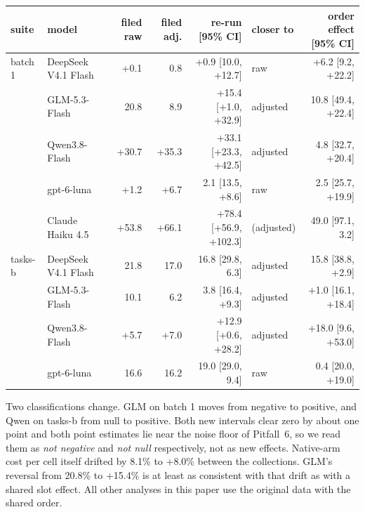 \documentclass[10pt]{article}
\newcommand*{\mi}{\textminus}   %
\newenvironment{inlinetable}{\par\medskip\noindent\begin{minipage}{\linewidth}\centering\small}{\end{minipage}\par\bigskip}
\begin{document}
\begin{inlinetable}
\label{tab:rerun}
\setlength{\tabcolsep}{3pt}
\begin{tabular}{@{}llrrrlr@{}}
\toprule
suite & model & filed raw & filed adj. & re-run [95\% CI] & closer to & order effect [95\% CI] \\
\midrule
batch 1 & DeepSeek V4.1 Flash & +0.1 & \mi{}0.8 & +0.9 [\mi{}10.0, +12.7] & raw & +6.2 [\mi{}9.2, +22.2] \\
 & GLM-5.3-Flash & \mi{}20.8 & \mi{}8.9 & +15.4 [+1.0, +32.9] & adjusted & \mi{}10.8 [\mi{}49.4, +22.4] \\
 & Qwen3.8-Flash & +30.7 & +35.3 & +33.1 [+23.3, +42.5] & adjusted & \mi{}4.8 [\mi{}32.7, +20.4] \\
 & gpt-6-luna & +1.2 & +6.7 & \mi{}2.1 [\mi{}13.5, +8.6] & raw & \mi{}2.5 [\mi{}25.7, +19.9] \\
 & Claude Haiku 4.5 & +53.8 & +66.1 & +78.4 [+56.9, +102.3] & (adjusted) & \mi{}49.0 [\mi{}97.1, \mi{}3.2] \\
\midrule
tasks-b & DeepSeek V4.1 Flash & \mi{}21.8 & \mi{}17.0 & \mi{}16.8 [\mi{}29.8, \mi{}6.3] & adjusted & \mi{}15.8 [\mi{}38.8, +2.9] \\
 & GLM-5.3-Flash & \mi{}10.1 & \mi{}6.2 & \mi{}3.8 [\mi{}16.4, +9.3] & adjusted & +1.0 [\mi{}16.1, +18.4] \\
 & Qwen3.8-Flash & +5.7 & +7.0 & +12.9 [+0.6, +28.2] & adjusted & +18.0 [\mi{}9.6, +53.0] \\
 & gpt-6-luna & \mi{}16.6 & \mi{}16.2 & \mi{}19.0 [\mi{}29.0, \mi{}9.4] & raw & \mi{}0.4 [\mi{}20.0, +19.0] \\
\bottomrule
\end{tabular}
\end{inlinetable}

Two classifications change. GLM on batch 1 moves from negative to positive, and Qwen on tasks-b from
null to positive. Both new intervals clear zero by about one point and both point estimates lie near
the noise floor of Pitfall~6, so we read them as \emph{not negative} and \emph{not null} respectively,
not as new effects. Native-arm cost per cell itself drifted by \mi{}8.1\% to +8.0\% between the
collections. GLM's reversal from \mi{}20.8\% to +15.4\% is at least as consistent with that drift as
with a shared slot effect. All other analyses in this paper use the original data with the shared order.
\end{document}
